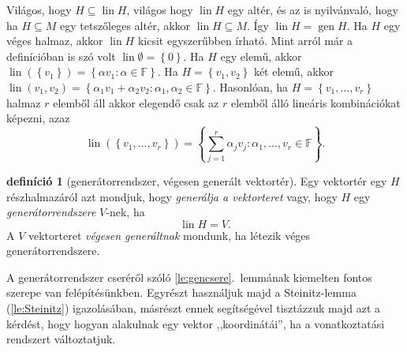 \documentclass[9pt, a4paper, showtrims]{memoir}
\makeatletter
\renewenvironment{proof}[1][\proofname]
    {\par\pushQED{\qed}%
    \normalfont \topsep6\p@\@plus6\p@\relax
    \trivlist
    \item[\hskip\labelsep
        \itshape
    #1\@addpunct{:}]\ignorespaces}
    {\popQED\endtrivlist\@endpefalse}
\theoremstyle{plain}
\theoremstyle{remark}
\theoremstyle{definition}
\newtheorem{definition}[proposition]{definíció}
\DeclareMathOperator{\lin}{lin}
\DeclareMathOperator{\gen}{gen}
\makeatother
\begin{document}
\begin{proof}
    Világos, hogy $H\subseteq \lin H$, világos hogy $\lin H$ egy altér, 
    és az is nyilvánvaló, hogy ha $H\subseteq M$ egy tetszőleges altér, 
    akkor $\lin H\subseteq M$.
    Így $\lin H=\gen H$.
\end{proof}
Ha $H$ egy véges halmaz, akkor $\lin H$ kicsit egyszerűbben írható.
Mint arról már a definícióban is szó volt $\lin \emptyset=\left\{ 0 \right\}$.
Ha $H$ egy elemű, akkor $\lin (\left\{ v_1 \right\})=\left\{ \alpha v_1:\alpha\in\mathbb{F} \right\}$.
Ha $H=\left\{ v_1,v_2 \right\}$ két elemű, akkor
$\lin({v_1,v_2})=\left\{ \alpha_1v_1+\alpha_2v_2:\alpha_1,\alpha_2\in\mathbb{F} \right\}$.
Hasonlóan, ha $H=\left\{ v_1,\dots,v_r \right\}$ halmaz $r$ elemből áll akkor elegendő csak az $r$ elemből álló lineáris kombinációkat képezni, azaz
\[
    \lin \left( \left\{ v_1,\dots,v_r \right\} \right)
    =
    \left\{ \sum_{j=1}^r\alpha_jv_j:\alpha_1,\dots,v_r\in\mathbb{F} \right\}.
\]
\begin{definition}[generátorrendszer, végesen generált vektortér]
    Egy vektortér egy $H$ részhalmazáról azt mondjuk, hogy \emph{generálja a vektorteret}
    vagy, hogy $H$ egy \emph{generátorrendszere} $V$-nek, ha 
    \[
        \lin H=V.
    \]
    A $V$ vektorteret \emph{végesen generáltnak} mondunk, ha létezik véges generátorrendszere.
\end{definition}

A generátorrendszer cseréről szóló \ref{le:gencsere}.~lemmának kiemelten fontos szerepe van felépítésünkben.
Egyrészt használjuk majd a Steinitz-lemma (\ref{le:Steinitz}) igazolásában, 
másrészt ennek segítségével tisztázzuk majd azt a kérdést,
hogy hogyan alakulnak egy vektor ,,koordinátái'', ha a vonatkoztatási rendszert változtatjuk.
\end{document}
